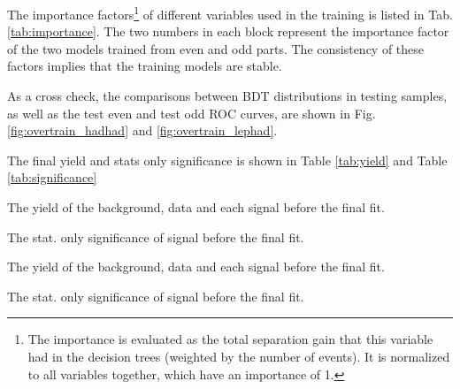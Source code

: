 The importance factors\footnote{
The importance is evaluated as the total separation gain that this variable had in the decision trees (weighted by the number of events). It is normalized to all variables together, which have an importance of 1.
}
of different variables used in the training is listed in Tab. \ref{tab:importance}. The two numbers in each block represent the importance factor of the two models trained from even and odd parts. The consistency of these factors implies that the training models are stable.




As a cross check, the comparisons between BDT distributions in testing samples, as well as the test even and test odd ROC curves, are shown in Fig. \ref{fig:overtrain_hadhad} and \ref{fig:overtrain_lephad}.



The final yield and stats only significance is shown in Table \ref{tab:yield} and Table \ref{tab:significance}

\begin{table}
\caption{The yield of the background, data and each signal before the final fit.}
\label{tab:yield}
%

%
\end{table}

\begin{table}
\caption{The stat. only significance of signal before the final fit.}
\label{tab:significance}
%

%
\end{table}


\begin{table}
\caption{The yield of the background, data and each signal before the final fit.}
\label{tab:yield}
%

%
\end{table}

\begin{table}
\caption{The stat. only significance of signal before the final fit.}
\label{tab:significance}
%

%
\end{table}



